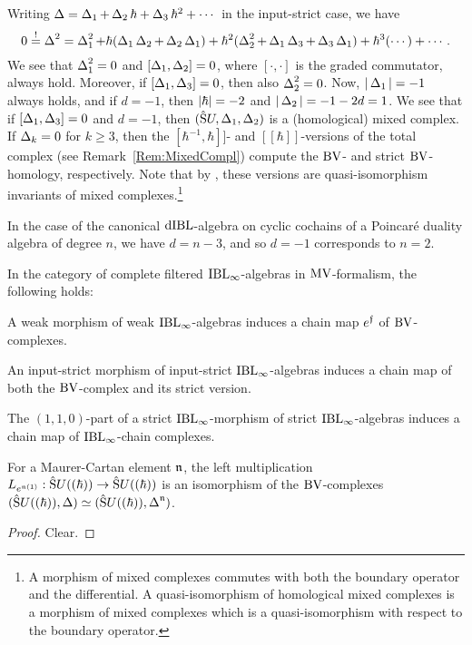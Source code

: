 \documentclass[\MainFolder/Text.tex]{subfiles}
\begin{document}
\begin{Remark}\label{Rem:BVBicomp}
Writing $\operatorname{\Delta} = \operatorname{\Delta}_1 + \operatorname{\Delta}_2 \hbar + \operatorname{\Delta}_3 \hbar^2 + \dotsb$ in the input-strict case, we have 
$$ 0 \overset{!}{=} \operatorname{\Delta}^2 = \operatorname{\Delta}_1^2 + \hbar(\operatorname{\Delta}_1 \operatorname{\Delta}_2 + \operatorname{\Delta}_2 \operatorname{\Delta}_1) + \hbar^2(\operatorname{\Delta}_2^2 + \operatorname{\Delta}_1 \operatorname{\Delta}_3 + \operatorname{\Delta}_3 \operatorname{\Delta}_1) + \hbar^3(\dotsb) + \dotsb. $$
We see that $\operatorname{\Delta}_1^2 = 0$ and $[\operatorname{\Delta}_1,\operatorname{\Delta}_2] = 0$, where $[\cdot,\cdot]$ is the graded commutator, always hold. Moreover, if $[\operatorname{\Delta}_1,\operatorname{\Delta}_3] = 0$, then also $\operatorname{\Delta}_2^2 = 0$. Now, $|\operatorname{\Delta}_1| = -1$ always holds, and if $d=-1$, then $|\hbar| = -2$ and $|\operatorname{\Delta}_2| = -1 - 2d = 1$. We see that if $[\operatorname{\Delta}_1,\operatorname{\Delta}_3]=0$ and $d=-1$, then $(\hat{\mathrm{S}}U, \operatorname{\Delta}_1, \operatorname{\Delta}_2)$ is a (homological) mixed complex. If $\operatorname{\Delta}_k = 0$ for $k \ge 3$, then the $[\hbar^{-1},\hbar]]$- and $[[\hbar]]$-versions of the total complex (see Remark~\ref{Rem:MixedCompl}) compute the $\mathrm{BV}$- and strict $\mathrm{BV}$-homology, respectively. Note that by \cite[Proposition~2.2]{Cieliebak2018b}, these versions are quasi-isomorphism invariants of mixed complexes.\footnote{A morphism of mixed complexes commutes with both the boundary operator and the differential. A quasi-isomorphism of homological mixed complexes is a morphism of mixed complexes which is a quasi-isomorphism with respect to the boundary operator.}

In the case of the canonical $\mathrm{dIBL}$-algebra on cyclic cochains of a Poincar\'e duality algebra of degree $n$, we have $d=n-3$, and so $d=-1$ corresponds to $n=2$.
\end{Remark}
\begin{Proposition}\label{Prop:ObservationsMor}
In the category of complete filtered $\mathrm{IBL}_\infty$-algebras in $\mathrm{MV}$-formalism, the following holds:
\begin{ClaimList}
 \item A weak morphism of weak $\mathrm{IBL}_\infty$-algebras induces a chain map $e^{\mathfrak{f}}$ of $\mathrm{BV}$-complexes.
 \item An input-strict morphism of input-strict $\mathrm{IBL}_\infty$-algebras induces a chain map of both the $\mathrm{BV}$-complex and its strict version. 
 \item The $(1,1,0)$-part of a strict $\mathrm{IBL}_\infty$-morphism of strict $\mathrm{IBL}_\infty$-algebras induces a chain map of $\mathrm{IBL}_\infty$-chain complexes.
 \item For a Maurer-Cartan element $\mathfrak{n}$, the left multiplication $L_{e^{\mathfrak{n}(1)}}: \hat{\mathrm{S}}U((\hbar))\rightarrow \hat{\mathrm{S}}U((\hbar))$ is an isomorphism of the $\mathrm{BV}$-complexes $(\hat{\mathrm{S}}U((\hbar)),\operatorname{\Delta})\simeq (\hat{\mathrm{S}}U((\hbar)),\operatorname{\Delta}^{\mathfrak{n}})$.
\end{ClaimList}
\end{Proposition}
\begin{proof}
Clear.
\end{proof}
\end{document}
